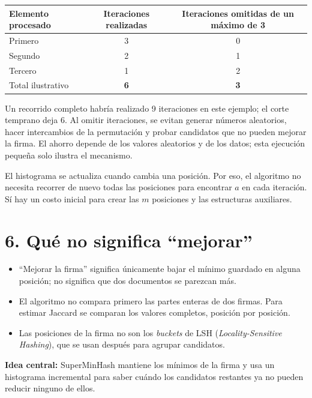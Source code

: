 \documentclass[11pt,a4paper]{article}
\begin{document}
\begin{center}
\begin{tabular}{lcc}
\toprule
Elemento procesado & Iteraciones realizadas & Iteraciones omitidas de un máximo de 3 \\
\midrule
Primero & 3 & 0 \\
Segundo & 2 & 1 \\
Tercero & 1 & 2 \\
\midrule
Total ilustrativo & \textbf{6} & \textbf{3} \\
\bottomrule
\end{tabular}
\end{center}

Un recorrido completo habría realizado 9 iteraciones en este ejemplo; el corte
temprano deja 6. Al omitir iteraciones, se evitan generar números aleatorios,
hacer intercambios de la permutación y probar candidatos que no pueden mejorar
la firma. El ahorro depende de los valores aleatorios y de los datos; esta
ejecución pequeña solo ilustra el mecanismo.

El histograma se actualiza cuando cambia una posición. Por eso, el algoritmo no
necesita recorrer de nuevo todas las posiciones para encontrar $a$ en cada
iteración. Sí hay un costo inicial para crear las $m$ posiciones y las
estructuras auxiliares.

\section*{6. Qué no significa “mejorar”}

\begin{itemize}[leftmargin=1.5em]
  \item “Mejorar la firma” significa únicamente bajar el mínimo guardado en
        alguna posición; no significa que dos documentos se parezcan más.
  \item El algoritmo no compara primero las partes enteras de dos firmas.
        Para estimar Jaccard se comparan los valores completos, posición por
        posición.
  \item Las posiciones de la firma no son los \emph{buckets} de LSH
        (\emph{Locality-Sensitive Hashing}), que se usan después para agrupar
        candidatos.
\end{itemize}

\textbf{Idea central:} SuperMinHash mantiene los mínimos de la firma y usa un
histograma incremental para saber cuándo los candidatos restantes ya no
pueden reducir ninguno de ellos.
\end{document}
